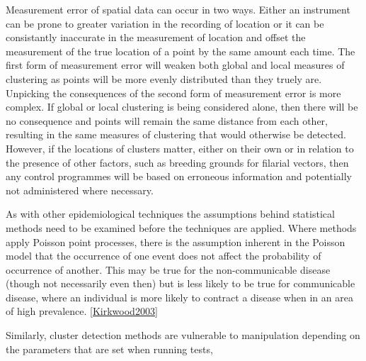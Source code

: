 \documentclass[11pt,a4paper]{article}
\begin{document}
Measurement error of spatial data can occur in two ways. 
Either an instrument can be prone to greater variation in the recording of location or it can be consistantly inaccurate in the measurement of location and offset the measurement of the true location of a point by the same amount each time. 
The first form of measurement error will weaken both global and local measures of clustering as points will be more evenly distributed than they truely are. 
Unpicking the consequences of the second form of measurement error is more complex. 
If global or local clustering is being considered alone, then there will be no consequence and points will remain the same distance from each other, resulting in the same measures of clustering that would otherwise be detected.
However, if the locations of clusters matter, either on their own or in relation to the presence of other factors, such as breeding grounds for filarial vectors, then any control programmes will be based on erroneous information and potentially not administered where necessary. 

As with other epidemiological techniques the assumptions behind statistical methods need to be examined before the techniques are applied. 
Where methods apply Poisson point processes, there is the assumption inherent in the Poisson model that the occurrence of one event does not affect the probability of occurrence of another. 
This may be true for the non-communicable disease (though not necessarily even then) but is less likely to be true for communicable disease, where an individual is more likely to contract a disease when in an area of high prevalence. \ref{Kirkwood2003}

Similarly, cluster detection methods are vulnerable to manipulation depending on the parameters that are set when running tests, 
\end{document}
